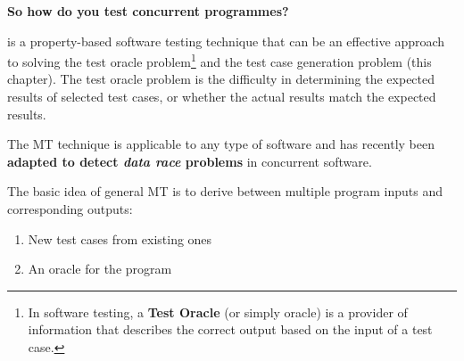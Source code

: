 \begin{examplebox}
    
\end{examplebox}

\begin{flushleft}
    \textcolor{Green3}{ \textbf{So how do you test concurrent programmes?}}
\end{flushleft}
 is a property-based software testing technique that can be an effective approach to solving the test oracle problem\footnote{In software testing, a \textbf{Test Oracle} (or simply oracle) is a provider of information that describes the correct output based on the input of a test case.} and the test case generation problem (this chapter). The test oracle problem is the difficulty in determining the expected results of selected test cases, or whether the actual results match the expected results.

\highspace
The MT technique is applicable to any type of software and has recently been \textbf{adapted to detect \emph{data race} problems} in concurrent software.

\highspace
The basic idea of general MT is to derive  between multiple program inputs and corresponding outputs:
\begin{enumerate}
    \item New test cases from existing ones
    \item An oracle for the program
\end{enumerate}

